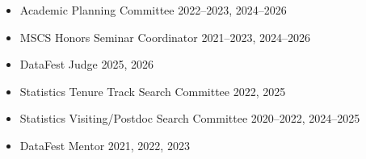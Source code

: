 \documentclass[margin]{res}
\begin{document}
\begin{resume}
\begin{itemize}
\begin{itemize}
		\item Academic Planning Committee \hfill 2022--2023, 2024--2026
		
		\item MSCS Honors Seminar Coordinator  \hfill 2021--2023, 2024--2026 %
			
		\item DataFest Judge \hfill 2025, 2026
		
		\item Statistics Tenure Track Search Committee \hfill 2022, 2025  
			
		\item Statistics Visiting/Postdoc Search Committee \hfill 2020--2022, 2024--2025
		
		\item DataFest Mentor  \hfill 2021, 2022, 2023%
		    
		

		
		\end{itemize}
	\end{itemize}



\end{resume}
\end{document}
